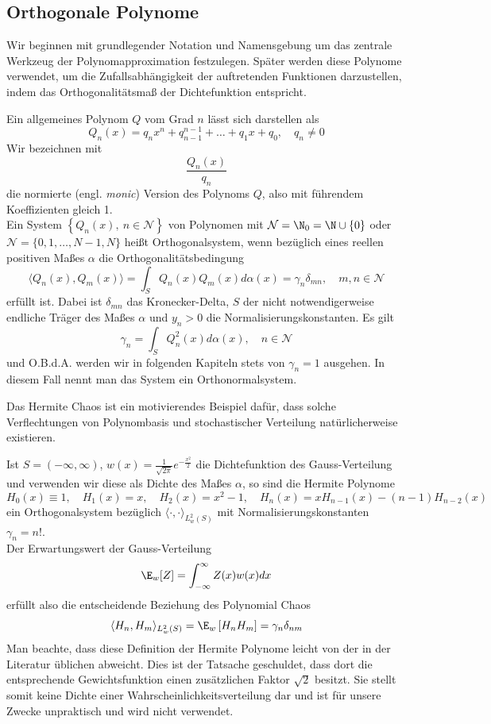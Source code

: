 \subsection{Orthogonale Polynome}
Wir beginnen mit grundlegender Notation und Namensgebung um das zentrale Werkzeug der Polynomapproximation festzulegen. Später werden diese Polynome verwendet, um die Zufallsabhängigkeit der auftretenden Funktionen darzustellen, indem das Orthogonalitätsmaß der Dichtefunktion entspricht.
\begin{mathdef}
Ein allgemeines Polynom $Q$ vom Grad $n$ lässt sich darstellen als
\[Q_n(x)=q_nx^n+q_{n-1}^{n-1}+\dots+q_1x+q_0,\quad q_n\ne 0\]
Wir bezeichnen mit 
\[\frac{Q_n(x)}{q_n}\]
die normierte (engl. \emph{monic}) Version des Polynoms $Q$, also mit führendem Koeffizienten gleich 1.\\
 Ein System $\left\lbrace Q_n(x),\: n\in\mathcal{N}\right\rbrace$ von Polynomen mit $\mathcal{N}=\N_0=\N\cup\lbrace 0\rbrace$ oder $\mathcal{N}=\lbrace 0,1,\dots,N-1,N\rbrace$ heißt Orthogonalsystem, wenn bezüglich eines reellen positiven Maßes $\alpha$ die Orthogonalitätsbedingung
 \[\langle Q_n(x),Q_m(x)\rangle =\int_S Q_n(x)Q_m(x)d\alpha(x)=\gamma_n\delta_{mn},\quad m,n\in\mathcal{N}\]
 erfüllt ist. Dabei ist $\delta_{mn}$ das Kronecker-Delta, $S$ der nicht notwendigerweise endliche Träger des Maßes $\alpha$ und $y_n>0$ die Normalisierungskonstanten. Es gilt 
 \[\gamma_n=\int_S Q_n^2(x)d\alpha(x),\quad n\in\mathcal{N}\] und O.B.d.A. werden wir in folgenden Kapiteln stets von $\gamma_n=1$ ausgehen. In diesem Fall nennt man das System ein Orthonormalsystem.
\end{mathdef}
Das Hermite Chaos ist ein motivierendes Beispiel dafür, dass solche Verflechtungen von Polynombasis und stochastischer Verteilung natürlicherweise existieren.
\begin{mathbsp}
Ist $S=(-\infty,\infty)$, $w(x)=\frac{1}{\sqrt{2\pi}}e^{-\frac{x^2}{2}}$ die Dichtefunktion des Gauss-Verteilung und verwenden wir diese als Dichte des Maßes $\alpha$, so sind die Hermite Polynome
\[H_0(x)\equiv 1,\quad H_1(x)=x,\quad H_2(x)=x^2-1,\quad H_n(x)=xH_{n-1}(x)-(n-1)H_{n-2}(x)\]
ein Orthogonalsystem bezüglich $\langle\cdot,\cdot\rangle_{L_w^2(S)}$ mit Normalisierungskonstanten $\gamma_n=n!$.\\
Der Erwartungswert der Gauss-Verteilung
\[\E_w[Z]= \int_{-\infty}^\infty Z(x)w(x)dx\] erfüllt also die entscheidende Beziehung des Polynomial Chaos
\[\langle H_n,H_m\rangle_{L_w^2(S)} =\E_w \left[H_nH_m\right]=\gamma_n\delta_{nm}\]
Man beachte, dass diese Definition der Hermite Polynome leicht von der in der Literatur üblichen abweicht. Dies ist der Tatsache geschuldet, dass dort die entsprechende Gewichtsfunktion einen zusätzlichen Faktor $\sqrt{2}$ besitzt. Sie stellt somit keine Dichte einer Wahrscheinlichkeitsverteilung dar und ist für unsere Zwecke unpraktisch und wird nicht verwendet. 
\end{mathbsp}

